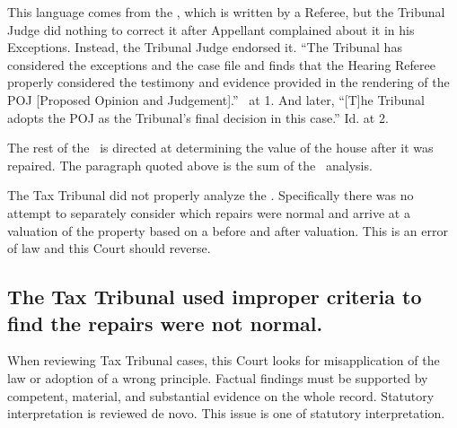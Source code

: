 \documentclass[12pt,\documentclassflag]{michiganCourtOfAppealsBrief}
\def\mathieuGast{\pincite[l]{MCL}{211.27(2)}}
\begin{document}
This language comes from the \POJ, which is written by a Referee, but the Tribunal Judge did nothing to correct it after Appellant complained about it in his Exceptions. Instead, the Tribunal Judge endorsed it. ``The Tribunal has considered the exceptions and the case file and finds that the Hearing Referee properly considered the testimony and evidence provided in the rendering of the POJ [Proposed Opinion and Judgement].'' \FOJ\ at 1. And later, ``[T]he Tribunal adopts the POJ as the Tribunal's final decision in this case.'' Id. at 2.

The rest of the \POJ\ is directed at determining the value of the house after it was repaired. The paragraph quoted above is the sum of the \mathieuGast\ analysis.

The Tax Tribunal did not properly analyze the \mathieuGast. Specifically there was no attempt to separately consider which repairs were normal and arrive at a valuation of the property based on a before and after valuation. This is an error of law and this Court should reverse.

\subsection{The Tax Tribunal used improper criteria to find the repairs were not normal.}

When reviewing Tax Tribunal cases, this Court looks for misapplication of the law or adoption of a wrong principle. Factual findings must be supported by competent, material, and substantial evidence on the whole record. Statutory interpretation is reviewed de novo.  This issue is one of statutory interpretation.
\end{document}
